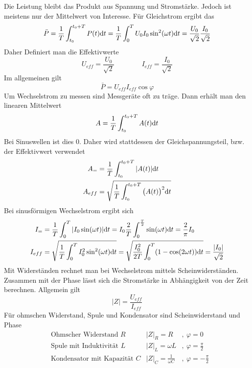 Die Leistung bleibt das Produkt aus Spannung und Stromstärke. Jedoch ist meistens nur der Mittelwert von Interesse. Für Gleichstrom ergibt das
\begin{equation}
	\bar{P} = \frac{1}{T} \int_{t_0}^{t_0+T} P(t) \mathrm{d} t = \frac{1}{T} \int_{0}^{T} U_0 I_0 \sin^2(\omega t) \mathrm{d} t = \frac{U_0}{\sqrt{2}} \frac{I_0}{\sqrt{2}}
\end{equation}
Daher Definiert man die Effektivwerte 
\begin{equation}
	U_{eff} = \frac{U_0}{\sqrt{2}} \qquad\qquad I_{eff} = \frac{I_0}{\sqrt{2}}
\end{equation}
Im allgemeinen gilt
\begin{equation}
	\bar P = U_{eff}I_{eff} \cos \varphi \label{eq:phase}
\end{equation}
Um Wechselstrom zu messen sind Messgeräte oft zu träge. Dann erhält man den linearen Mittelwert
\begin{equation}
	A = \frac{1}{T} \int_{t_0}^{t_0 + T} A(t) \mathrm{d} t 
\end{equation}
Bei Sinuswellen ist dies $ 0 $. Daher wird stattdessen der Gleichspannungsteil, bzw. der Effektivwert verwendet 
\begin{align}
	A_= &= \frac{1}{T} \int_{t_0}^{t_0 + T} |A(t)| \mathrm{d} t \\
	A_{eff} &= \sqrt{\frac{1}{T} \int_{t_0}^{t_0 + T} \big(A(t)\big)^2 \mathrm{d} t} 
\end{align}
Bei sinusförmigen Wechselstrom ergibt sich
\begin{align}
	I_{=} &= \frac{1}{T}\int_{0}^{T}|I_{0}\sin(\omega t)| \mathrm{d} t=I_{0}\frac{2}{T}\int_{0}^{\frac{T}{2}}\sin(\omega t) \mathrm{d} t = \frac{2}{\pi} I_0 \\
	I_{eff}&=\sqrt{\frac{1}{T}\int_{0}^{T}I_{0}^{2}\sin^{2}(\omega t)\mathrm{d} t}=\sqrt{\frac{I_{0}^{2}}{2T}\int_{0}^{T}(1-\cos(2\omega t))\mathrm{d} t}=\frac{|I_{0}|}{\sqrt{2}}
\end{align}
Mit Widerständen rechnet man bei Wechselstrom mittels Scheinwiderständen. Zusammen mit der Phase lässt sich die Stromstärke in Abhängigkeit von der Zeit berechnen. Allgemein gilt
\begin{equation}
	|Z| = \frac{U_{eff}}{I_{eff}}
\end{equation} Für ohmschen Widerstand, Spule und Kondensator sind Scheinwiderstand und Phase
\begin{align}
	&\text{Ohmscher Widerstand } R & |Z|_{R} = R &,~\varphi = 0 \label{eq:Rohm} \\
	&\text{Spule mit Induktivität } L & |Z|_{L} = \omega L &,~\varphi= \frac{\pi}{2} \\
	&\text{Kondensator mit Kapazität } C & |Z|_{C} = \frac{1}{\omega C} &,~\varphi = -\frac{\pi}{2}
\end{align}
